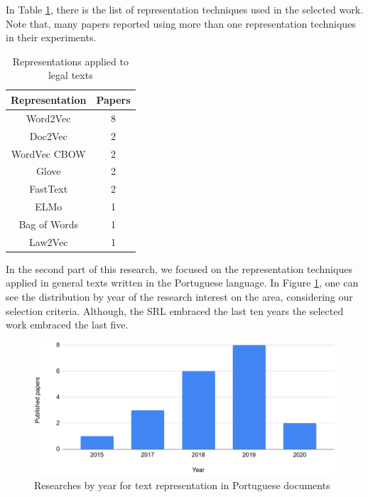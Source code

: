 In Table \ref{tab:rsl_representation_legal}, there is the list of representation techniques used in the selected work. Note that, many papers reported using more than one representation techniques in their experiments.

\begin{table}[htb]
\centering
\caption{Representations applied to legal texts}
\label{tab:rsl_representation_legal}
\begin{tabular}{cc}
\hline
\textbf{Representation} & \textbf{Papers} \\ \hline
Word2Vec                & 8               \\
Doc2Vec                 & 2               \\
WordVec CBOW           & 2               \\
Glove                   & 2               \\
FastText                & 2               \\
ELMo                    & 1               \\
Bag of Words            & 1               \\
Law2Vec                 & 1              \\\bottomrule
\end{tabular}
\end{table}

In the second part of this research, we focused on the representation techniques applied in general texts written in the Portuguese language. In Figure \ref{fig:rsl_representation_portuguese_year}, one can see the distribution by year of the research interest on the area, considering our selection criteria. Although, the SRL embraced the last ten years the selected work embraced the last five.


\begin{figure}[htb]
    \centering
    \caption{Researches by year for text representation in Portuguese documents}
    \label{fig:rsl_representation_portuguese_year}
    \includegraphics[width=\textwidth]{images/appendix/rsl_portuguese_representation.png}
\end{figure}

